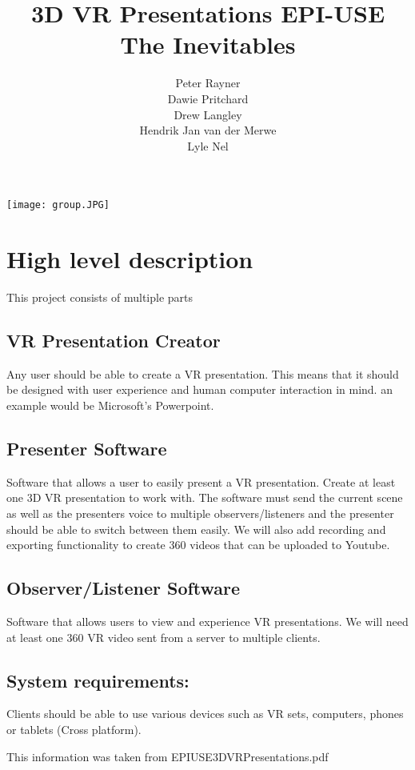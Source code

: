 \documentclass{article}
\title{3D VR Presentations EPI-USE \\
The Inevitables
}
\author{  
            Peter Rayner\\
            Dawie Pritchard\\
            Drew Langley\\
            Hendrik Jan van der Merwe\\
            Lyle Nel\\
        }
\begin{document}
\maketitle

\texttt{[image: group.JPG]}

\newpage

\tableofcontents

\newpage


\section{High level description}
This project consists of multiple parts
\subsection{VR Presentation Creator}
Any user should be able to create a VR presentation. This means that it should be designed with user experience and human computer interaction in mind.
an example would be Microsoft's Powerpoint.

\subsection{Presenter Software}
Software that allows a user to easily present a VR presentation. Create at least one 3D VR presentation to work with. The software must send the current scene as well as the presenters voice to multiple observers/listeners and the presenter should be able to switch between them easily. We will also add recording and exporting functionality to create 360 videos that can be uploaded to Youtube.

\subsection{Observer/Listener Software}
Software that allows users to view and experience VR presentations. We will need at least one 360 VR video sent from a server to multiple clients. 


\subsection{System requirements:}
Clients should be able to use various devices such as VR sets, computers, phones or tablets (Cross platform).

This information was taken from EPIUSE3DVRPresentations.pdf
\end{document}
